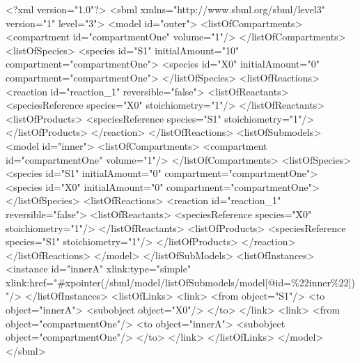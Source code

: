 \documentclass{cekarticle}
\begin{document}
\pagebreak

\begin{example}
<?xml version="1.0"?>
<sbml xmlns="http://www.sbml.org/sbml/level3" version="1" level="3">
    <model id="outer">
        <listOfCompartments>
            <compartment id="compartmentOne" volume="1"/>
        </listOfCompartments>
        <listOfSpecies>
            <species id="S1" initialAmount="10" compartment="compartmentOne">
            <species id="X0" initialAmount="0" compartment="compartmentOne">
        </listOfSpecies>
        <listOfReactions>
            <reaction id="reaction_1" reversible="false">
                <listOfReactants>
                    <speciesReference species="X0" stoichiometry="1"/>
                </listOfReactants>
                <listOfProducts>
                    <speciesReference species="S1" stoichiometry="1"/>
                </listOfProducts>
            </reaction>
        </listOfReactions>
        <listOfSubmodels>
            <model id="inner">
                <listOfCompartments>
                    <compartment id="compartmentOne" volume="1"/>
                </listOfCompartments>
                <listOfSpecies>
                    <species id="S1" initialAmount="0" compartment="compartmentOne">
                    <species id="X0" initialAmount="0" compartment="compartmentOne">
                </listOfSpecies>
                <listOfReactions>
                    <reaction id="reaction_1" reversible="false">
                        <listOfReactants>
                            <speciesReference species="X0" stoichiometry="1"/>
                        </listOfReactants>
                        <listOfProducts>
                            <speciesReference species="S1" stoichiometry="1"/>
                        </listOfProducts>
                    </reaction>
                </listOfReactions>
            </model>
        </listOfSubModels>
        <listOfInstances>
            <instance
                id="innerA" 
                xlink:type="simple"
                xlink:href="#xpointer(/sbml/model/listOfSubmodels/model[@id=\%22inner\%22])"/>
        </listOfInstances>
        <listOfLinks>
            <link>
                <from object="S1"/>
                <to object="innerA">
                    <subobject object="X0"/>
                </to>
            </link>
            <link>
                <from object="compartmentOne"/>
                <to object="innerA">
                    <subobject object="compartmentOne"/>
                </to>
            </link>
        </listOfLinks>
    </model>
</sbml>
\end{example}
\end{document}
